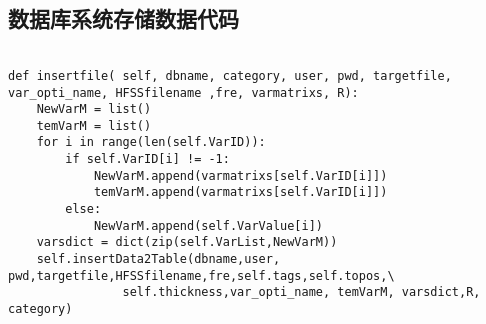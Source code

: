 \begin{appendix}

    \section{数据库系统存储数据代码}

    \begin{verbatim}

def insertfile( self, dbname, category, user, pwd, targetfile, var_opti_name, HFSSfilename ,fre, varmatrixs, R):    
    NewVarM = list()
    temVarM = list()
    for i in range(len(self.VarID)):
        if self.VarID[i] != -1:
            NewVarM.append(varmatrixs[self.VarID[i]])
            temVarM.append(varmatrixs[self.VarID[i]])
        else:
            NewVarM.append(self.VarValue[i])
    varsdict = dict(zip(self.VarList,NewVarM))
    self.insertData2Table(dbname,user, pwd,targetfile,HFSSfilename,fre,self.tags,self.topos,\
                self.thickness,var_opti_name, temVarM, varsdict,R, category)   
     \end{verbatim}

\end{appendix}

        